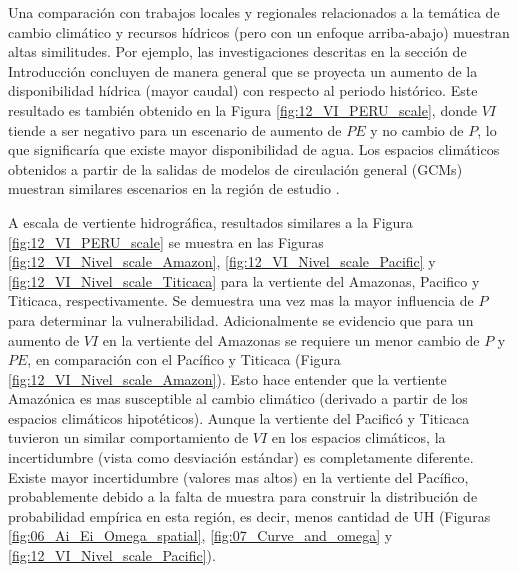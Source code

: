 \documentclass[12pt]{article}
\begin{document}
\thispagestyle{empty}

Una comparación con trabajos locales y regionales relacionados a la temática de cambio climático y recursos hídricos (pero con un enfoque arriba-abajo) muestran altas similitudes. Por ejemplo, las investigaciones descritas en la sección de Introducción \citep{Pouyaud2005,Juen2007,LavadoCasimiro2011,Andres2014,VanSoesbergen2016,Olsson2017,Pilares2018} concluyen de manera general que se proyecta un aumento de la disponibilidad hídrica (mayor caudal) con respecto al periodo histórico. Este resultado es también obtenido en la Figura \ref{fig:12_VI_PERU_scale}, donde $VI$ tiende a ser negativo para un escenario de aumento de $PE$ y no cambio de $P$, lo que significaría que existe mayor disponibilidad de agua. Los espacios climáticos obtenidos a partir de la salidas de modelos de circulación general (GCMs) muestran similares escenarios en la región de estudio \citep{stocker2013climate}. 



\thispagestyle{empty}

A escala de vertiente hidrográfica, resultados similares a la Figura \ref{fig:12_VI_PERU_scale} se muestra en las Figuras \ref{fig:12_VI_Nivel_scale_Amazon}, \ref{fig:12_VI_Nivel_scale_Pacific} y \ref{fig:12_VI_Nivel_scale_Titicaca} para la vertiente del Amazonas, Pacifico y Titicaca, respectivamente. Se demuestra una vez mas la mayor influencia de $P$ para determinar la vulnerabilidad. Adicionalmente se evidencio que para un aumento de $VI$ en la vertiente del Amazonas se requiere un menor cambio de $P$ y $PE$, en comparación con el Pacífico y Titicaca (Figura \ref{fig:12_VI_Nivel_scale_Amazon}). Esto hace entender que la vertiente Amazónica es mas susceptible al cambio climático (derivado a partir de los espacios climáticos hipotéticos). Aunque la vertiente del Pacificó y Titicaca tuvieron un similar comportamiento de $VI$ en los espacios climáticos, la incertidumbre (vista como desviación estándar) es completamente diferente. Existe mayor incertidumbre (valores mas altos) en la vertiente del Pacífico, probablemente debido a la falta de muestra para construir la distribución de probabilidad empírica en esta región, es decir, menos cantidad de UH (Figuras \ref{fig:06_Ai_Ei_Omega_spatial}, \ref{fig:07_Curve_and_omega} y \ref{fig:12_VI_Nivel_scale_Pacific}). 


\vspace*{.5cm}

\end{document}
